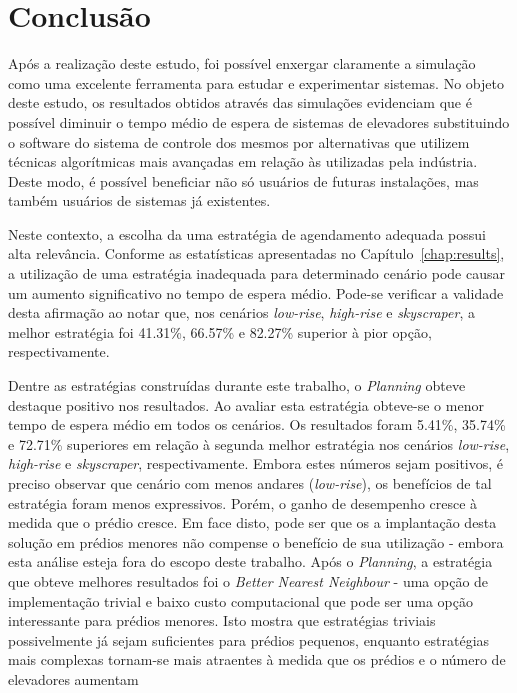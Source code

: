 \chapter{\label{chap:conclusion}Conclusão}

Após a realização deste estudo, foi possível enxergar claramente a simulação
como uma excelente ferramenta para estudar e experimentar sistemas. No objeto
deste estudo, os resultados obtidos através das simulações evidenciam que é
possível diminuir o tempo médio de espera de sistemas de elevadores substituindo
o software do sistema de controle dos mesmos por alternativas que utilizem
técnicas algorítmicas mais avançadas em relação às utilizadas pela indústria.
Deste modo, é possível beneficiar não só usuários de futuras instalações, mas
também usuários de sistemas já existentes.

Neste contexto, a escolha da uma estratégia de agendamento adequada possui alta
relevância. Conforme as estatísticas apresentadas no
Capítulo~\ref{chap:results}, a utilização de uma estratégia inadequada para
determinado cenário pode causar um aumento significativo no tempo de espera
médio. Pode-se verificar a validade desta afirmação ao notar que, nos cenários
\textit{low-rise}, \textit{high-rise} e \textit{skyscraper}, a melhor estratégia
foi 41.31\%, 66.57\% e 82.27\% superior à pior opção, respectivamente.

Dentre as estratégias construídas durante este trabalho, o \textit{Planning}
obteve destaque positivo nos resultados. Ao avaliar esta estratégia obteve-se o
menor tempo de espera médio em todos os cenários. Os resultados foram 5.41\%,
35.74\% e 72.71\% superiores em relação à segunda melhor estratégia nos cenários
\textit{low-rise}, \textit{high-rise} e \textit{skyscraper}, respectivamente.
Embora estes números sejam positivos, é preciso observar que cenário com menos
andares (\textit{low-rise}), os benefícios de tal estratégia foram menos
expressivos. Porém, o ganho de desempenho cresce à medida que o prédio cresce.
Em face disto, pode ser que os a implantação desta solução em prédios menores
não compense o benefício de sua utilização - embora esta análise esteja fora do
escopo deste trabalho. Após o \textit{Planning}, a estratégia que obteve
melhores resultados foi o \textit{Better Nearest Neighbour} - uma opção de
implementação trivial e baixo custo computacional que pode ser uma opção
interessante para prédios menores. Isto mostra que estratégias triviais
possivelmente já sejam suficientes para prédios pequenos, enquanto estratégias
mais complexas tornam-se mais atraentes à medida que os prédios e o número de
elevadores aumentam

